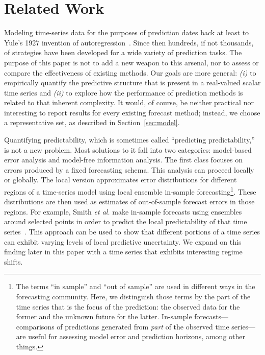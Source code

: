 \section{Related Work }\label{sec:related}

Modeling time-series data for the purposes of prediction dates back at
least to Yule's 1927 invention of autoregression~\cite{Yule27}.  Since
then hundreds, if not thousands, of strategies have been developed for
a wide variety of prediction tasks.  The purpose of this paper is not
to add a new weapon to this arsenal, nor to assess or compare the
effectiveness of existing methods.  Our goals are more general: {\sl
  (i)} to empirically quantify the predictive structure that is
present in a real-valued scalar time series and {\sl (ii)} to explore
how the performance of prediction methods is related to that inherent
complexity.  It would, of course, be neither practical nor interesting
to report results for every existing forecast method; instead, we
choose a representative set, as described in Section~\ref{sec:model}.

Quantifying predictability, which is sometimes called ``predicting
predictability,'' is not a new problem.  Most solutions to it fall
into two categories: model-based error analysis and model-free
information analysis.
%
%
%
The first class focuses on errors produced by a fixed forecasting
schema.  This analysis can proceed locally or globally.  The local
version approximates error distributions for different regions of a
time-series model using local ensemble in-sample
forecasting\footnote{The terms ``in sample'' and ``out of sample'' are
  used in different ways in the forecasting community.  Here, we
  distinguish those terms by the part of the time series that is the
  focus of the prediction: the observed data for the former and the
  unknown future for the latter.  In-sample forecasts---comparisons of
  predictions generated from \emph{part} of the observed time
  series---are useful for assessing model error and prediction
  horizons, among other things.}.
%
These distributions are then used as estimates of out-of-sample
forecast errors in those regions.  For example, Smith {\sl et al.}
make in-sample forecasts using ensembles around selected points in
order to predict the local predictability of that time
series~\cite{Smith199250}.  This approach can be used to show that
different portions of a time series can exhibit varying levels of
local predictive uncertainty.  We expand on this finding later in this
paper with a time series that exhibits interesting regime shifts.

